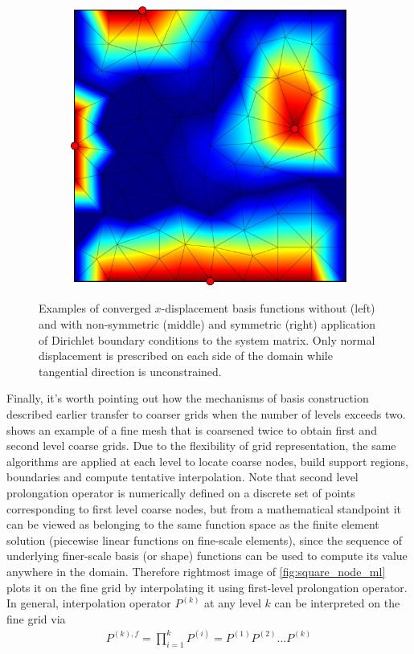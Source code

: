 \begin{figure}[htbp]
\begin{subfigure}[t]{0.3\textwidth}
  \end{subfigure}
  \hfill
  \begin{subfigure}[t]{0.3\textwidth}
    \centerline{\includegraphics[width=0.9\linewidth]{figs/square/square_tria_metis_node_conv_bc_symm}}
  \end{subfigure}
  \caption[Nodal basis function with boundary condition effects]{\label{fig:square_node_bc} Examples of converged $x$-displacement basis functions without (left) and with non-symmetric (middle) and symmetric (right) application of Dirichlet boundary conditions to the system matrix.   Only normal displacement is prescribed on each side of the domain while tangential direction is unconstrained.}
\end{figure}

Finally, it's worth pointing out how the mechanisms of basis construction described earlier transfer to coarser grids when the number of levels exceeds two.    shows an example of a fine mesh that is coarsened twice to obtain first and second level coarse grids.   Due to the flexibility of grid representation, the same algorithms are applied at each level to locate coarse nodes, build support regions, boundaries and compute tentative interpolation.   Note that second level prolongation operator is numerically defined on a discrete set of points corresponding to first level coarse nodes, but from a mathematical standpoint it can be viewed as belonging to the same function space as the finite element solution (piecewise linear functions on fine-scale elements), since the sequence of underlying finer-scale basis (or shape) functions can be used to compute its value anywhere in the domain.    Therefore rightmost image of \cref{fig:square_node_ml} plots it on the fine grid by interpolating it using first-level prolongation operator.    In general, interpolation operator $P^{(k)}$ at any level $k$ can be interpreted on the fine grid via 
\begin{align}
    P^{(k),f} = \prod\limits_{i=1}^{k}P^{(i)} = P^{(1)}P^{(2)} \ldots P^{(k)}
\end{align}

